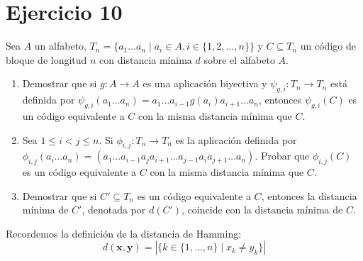 \section{Ejercicio 10}

\begin{formulationBox}
	Sea $A$ un alfabeto, $T_n = \{a_1\hdots a_n\mid a_i\in A, i\in\{1,2,\hdots,n\}\}$ y $C\subseteq T_n$ un código de bloque de longitud $n$ con distancia mínima $d$ sobre el alfabeto $A$.
	
	\begin{enumerate}[label=\alph*)]
		\item Demostrar que si $g:A\rightarrow A$ es una aplicación biyectiva y $\psi_{g,i} : T_n\rightarrow T_n$ está definida por $\psi_{g, i}(a_1\hdots a_n) = a_1\hdots a_{i-1}g(a_i)a_{i+1}\hdots a_n$, entonces $\psi_{g,i}(C)$ es un código equivalente a $C$ con la misma distancia mínima que $C$.
		\item Sea $1 \leq i < j \leq n$. Si $\phi_{i,j}:T_n\rightarrow T_n$ es la aplicación definida por $\phi_{i,j}(a_i\hdots a_n) = (a_1\hdots a_{i-1}a_ja_{i+1}\hdots a_{j-1}a_ia_{j+1}\hdots a_n)$. Probar que $\phi_{i,j}(C)$ es un código equivalente a $C$ con la misma distancia mínima que $C$.
		\item Demostrar que si $C'\subseteq T_n$ es un código equivalente a $C$, entonces la distancia mínima de $C'$, denotada por $d(C')$, coincide con la distancia mínima de $C$.
	\end{enumerate}
\end{formulationBox}

Recordemos la definición de la distancia de Hamming:
\[d(\textbf{x}, \textbf{y}) = |\{k \in \{1,\hdots,n\} \mid x_k \neq y_k\}|\]

